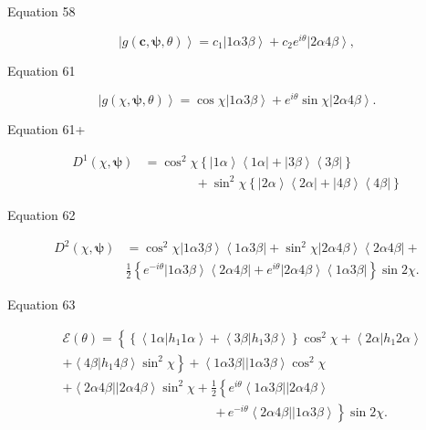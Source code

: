 \documentclass[aps]{revtex4}%
\begin{document}
Equation 58%

\[
\left\vert g\left(  \boldsymbol{c},\boldsymbol{\psi},\theta\right)
\right\rangle =c_{1}\left\vert 1\alpha3\beta\right\rangle +c_{2}e^{i\theta
}\left\vert 2\alpha4\beta\right\rangle ,
\]


Equation 61%

\[
\left\vert g\left(  \chi,\boldsymbol{\psi},\theta\right)  \right\rangle
=\cos\chi\left\vert 1\alpha3\beta\right\rangle +e^{i\theta}\sin\chi\left\vert
2\alpha4\beta\right\rangle .
\]


Equation 61+%

\begin{align*}
D^{1}\left(  \chi,\boldsymbol{\psi}\right)   &  =\cos^{2}\chi\left\{
\left\vert 1\alpha\right\rangle \left\langle 1\alpha\right\vert +\left\vert
3\beta\right\rangle \left\langle 3\beta\right\vert \right\} \\
&  \qquad\qquad+\sin^{2}\chi\left\{  \left\vert 2\alpha\right\rangle
\left\langle 2\alpha\right\vert +\left\vert 4\beta\right\rangle \left\langle
4\beta\right\vert \right\}
\end{align*}


Equation 62%

\begin{align*}
D^{2}\left(  \chi,\boldsymbol{\psi}\right)   &  =\cos^{2}\chi\left\vert
1\alpha3\beta\right\rangle \left\langle 1\alpha3\beta\right\vert +\sin^{2}%
\chi\left\vert 2\alpha4\beta\right\rangle \left\langle 2\alpha4\beta
\right\vert +\\
&  \frac{1}{2}\left\{  e^{-i\theta}\left\vert 1\alpha3\beta\right\rangle
\left\langle 2\alpha4\beta\right\vert +e^{i\theta}\left\vert 2\alpha
4\beta\right\rangle \left\langle 1\alpha3\beta\right\vert \right\}  \sin2\chi.
\end{align*}


Equation 63%

\begin{align*}
&  \mathcal{E}\left(  \theta\right)  =\left\{  \left\{  \left\langle
1\alpha\left\vert h_{1}1\alpha\right.  \right\rangle +\left\langle
3\beta\left\vert h_{1}3\beta\right.  \right\rangle \right\}  \cos^{2}%
\chi+\left\langle 2\alpha\left\vert h_{1}2\alpha\right.  \right\rangle \right.
\\
&  \left.  +\left\langle 4\beta\left\vert h_{1}4\beta\right.  \right\rangle
\sin^{2}\chi\right\}  +\left\langle 1\alpha3\beta\right\vert \left\vert
1\alpha3\beta\right\rangle \cos^{2}\chi\\
&  +\left\langle 2\alpha4\beta\right\vert \left\vert 2\alpha4\beta
\right\rangle \sin^{2}\chi+\frac{1}{2}\left\{  e^{i\theta}\left\langle
1\alpha3\beta\right\vert \left\vert 2\alpha4\beta\right\rangle \right. \\
&  \qquad\qquad\qquad\qquad\qquad\qquad\left.  +\,e^{-i\theta}\left\langle
2\alpha4\beta\right\vert \left\vert 1\alpha3\beta\right\rangle \right\}
\sin2\chi.
\end{align*}
\end{document}

